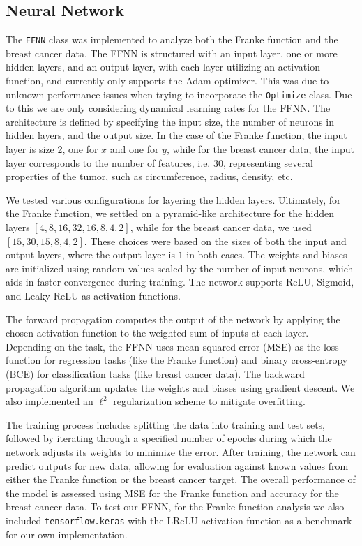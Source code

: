 \documentclass[%
reprint,s
amsmath,amssymb,
aps,
]{revtex4-2}
\begin{document}
\subsection{Neural Network}
The \texttt{FFNN} class was implemented to analyze both the Franke function and the breast cancer data. The FFNN is structured with an input layer, one or more hidden layers, and an output layer, with each layer utilizing an activation function, and currently only supports the Adam optimizer. This was due to unknown performance issues when trying to incorporate the \texttt{Optimize} class. Due to this we are only considering dynamical learning rates for the FFNN. The architecture is defined by specifying the input size, the number of neurons in hidden layers, and the output size. In the case of the Franke function, the input layer is size 2, one for \(x\) and one for \(y\), while for the breast cancer data, the input layer corresponds to the number of features, i.e. \(30\), representing several properties of the tumor, such as circumference, radius, density, etc.

We tested various configurations for layering the hidden layers. Ultimately, for the Franke function, we settled on a pyramid-like architecture for the hidden layers \([4,8,16,32,16,8,4,2]\), while for the breast cancer data, we used \([15,30,15,8,4,2]\). These choices were based on the sizes of both the input and output layers, where the output layer is \(1\) in both cases. The weights and biases are initialized using random values scaled by the number of input neurons, which aids in faster convergence during training. The network supports ReLU, Sigmoid, and Leaky ReLU as activation functions. 

The forward propagation computes the output of the network by applying the chosen activation function to the weighted sum of inputs at each layer. Depending on the task, the FFNN uses mean squared error (MSE) as the loss function for regression tasks (like the Franke function) and binary cross-entropy (BCE) for classification tasks (like breast cancer data). The backward propagation algorithm updates the weights and biases using gradient descent. We also implemented an $\ell^2$ regularization scheme to mitigate overfitting.

The training process includes splitting the data into training and test sets, followed by iterating through a specified number of epochs during which the network adjusts its weights to minimize the error. After training, the network can predict outputs for new data, allowing for evaluation against known values from either the Franke function or the breast cancer target. The overall performance of the model is assessed using MSE for the Franke function and accuracy for the breast cancer data. To test our FFNN, for the Franke function analysis we also included \texttt{tensorflow.keras} with the LReLU activation function as a benchmark for our own implementation.
\end{document}
